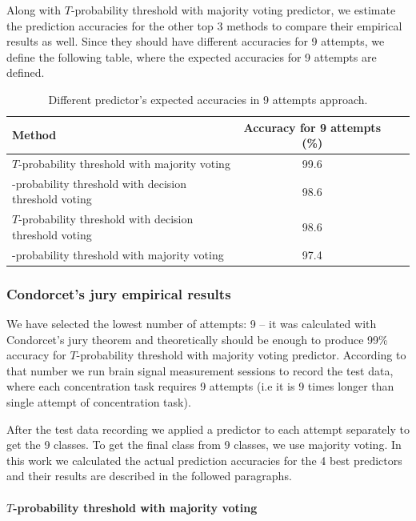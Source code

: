 \documentclass[12pt]{article}
\theoremstyle{definition}
\begin{document}
Along with $T$-probability threshold with majority voting predictor, we estimate the prediction accuracies for the other top 3 methods to compare their empirical results as well. Since they should have different accuracies for 9 attempts, we define the following table, where the expected accuracies for 9 attempts are defined.

\begin{table}[H]
\begin{center}
  \begin{tabular}{ | l | c | c | c | }
    \hline
    Method &\parbox[c]{1.8cm}{\raggedright Accuracy for 9 attempts (\%)}\\ \hline
    $T$-probability threshold with majority voting & 99.6 \\ \hline
    -probability threshold with decision threshold voting & 98.6 \\ \hline
	$T$-probability threshold with decision threshold voting & 98.6 \\ \hline
	-probability threshold with majority voting & 97.4 \\ \hline
  \end{tabular}
\end{center}
\caption{Different predictor's expected accuracies in 9 attempts approach.}
\end{table}

\subsubsection{Condorcet's jury empirical results}

We have selected the lowest number of attempts: 9 -- it was calculated with Condorcet's jury theorem and theoretically should be enough to produce 99\% accuracy for $T$-probability threshold with majority voting predictor. According to that number we run brain signal measurement sessions to record the test data, where each concentration task requires 9 attempts (i.e it is 9 times longer than single attempt of concentration task).

After the test data recording we applied a predictor to each attempt separately to get the 9 classes. To get the final class from 9 classes, we use majority voting. In this work we calculated the actual prediction accuracies for the 4 best predictors and their results are described in the followed paragraphs.

\paragraph{$T$-probability threshold with majority voting}~\\
\end{document}
